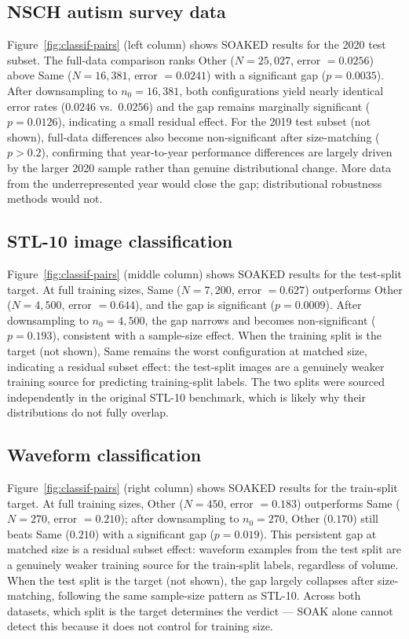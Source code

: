 \documentclass{article}
\begin{document}
\subsection{NSCH autism survey data}
Figure~\ref{fig:classif-pairs} (left column) shows SOAKED results for the 2020 test subset.
The full-data comparison ranks Other ($N=25{,}027$, error $= 0.0256$) above Same ($N=16{,}381$, error $= 0.0241$) with a significant gap ($p = 0.0035$).
After downsampling to $n_0 = 16{,}381$, both configurations yield nearly identical error rates ($0.0246$ vs.\ $0.0256$) and the gap remains marginally significant ($p = 0.0126$), indicating a small residual effect.
For the 2019 test subset (not shown), full-data differences also become non-significant after size-matching ($p > 0.2$), confirming that year-to-year performance differences are largely driven by the larger 2020 sample rather than genuine distributional change.
More data from the underrepresented year would close the gap; distributional robustness methods would not.

\subsection{STL-10 image classification}
Figure~\ref{fig:classif-pairs} (middle column) shows SOAKED results for the test-split target.
At full training sizes, Same ($N=7{,}200$, error $= 0.627$) outperforms Other ($N=4{,}500$, error $= 0.644$), and the gap is significant ($p = 0.0009$).
After downsampling to $n_0 = 4{,}500$, the gap narrows and becomes non-significant ($p = 0.193$), consistent with a sample-size effect.
When the training split is the target (not shown), Same remains the worst configuration at matched size, indicating a residual subset effect: the test-split images are a genuinely weaker training source for predicting training-split labels.
The two splits were sourced independently in the original STL-10 benchmark, which is likely why their distributions do not fully overlap.

\subsection{Waveform classification}
Figure~\ref{fig:classif-pairs} (right column) shows SOAKED results for the train-split target.
At full training sizes, Other ($N=450$, error $= 0.183$) outperforms Same ($N=270$, error $= 0.210$); after downsampling to $n_0 = 270$, Other ($0.170$) still beats Same ($0.210$) with a significant gap ($p = 0.019$).
This persistent gap at matched size is a residual subset effect: waveform examples from the test split are a genuinely weaker training source for the train-split labels, regardless of volume.
When the test split is the target (not shown), the gap largely collapses after size-matching, following the same sample-size pattern as STL-10.
Across both datasets, which split is the target determines the verdict --- SOAK alone cannot detect this because it does not control for training size.
\end{document}
